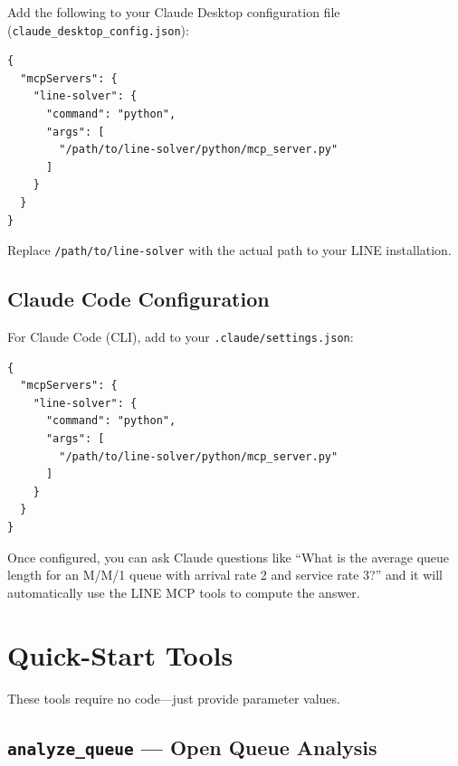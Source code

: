 \documentclass[11pt]{article}
\begin{document}
Add the following to your Claude Desktop configuration file (\texttt{claude\_desktop\_config.json}):

\begin{lstlisting}[style=jsonstyle]
{
  "mcpServers": {
    "line-solver": {
      "command": "python",
      "args": [
        "/path/to/line-solver/python/mcp_server.py"
      ]
    }
  }
}
\end{lstlisting}

Replace \texttt{/path/to/line-solver} with the actual path to your LINE installation.

\subsection{Claude Code Configuration}

For Claude Code (CLI), add to your \texttt{.claude/settings.json}:

\begin{lstlisting}[style=jsonstyle]
{
  "mcpServers": {
    "line-solver": {
      "command": "python",
      "args": [
        "/path/to/line-solver/python/mcp_server.py"
      ]
    }
  }
}
\end{lstlisting}

\begin{tipbox}
Once configured, you can ask Claude questions like ``What is the average queue length for an M/M/1 queue with arrival rate 2 and service rate 3?'' and it will automatically use the LINE MCP tools to compute the answer.
\end{tipbox}

\section{Quick-Start Tools}

These tools require no code---just provide parameter values.

\subsection{\texttt{analyze\_queue} --- Open Queue Analysis}
\end{document}
